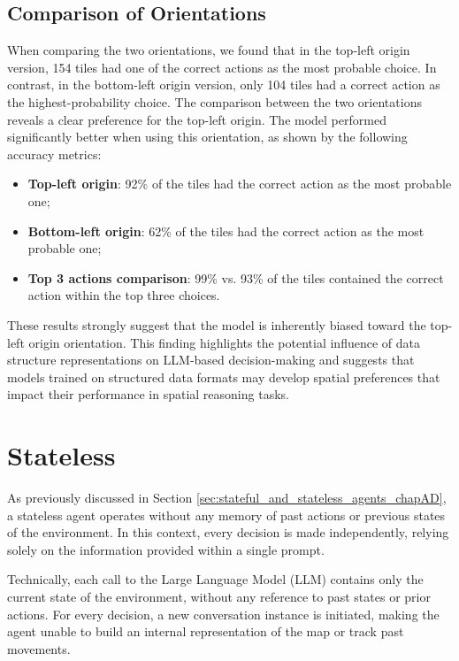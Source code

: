 \vspace{5mm}

\subsection{Comparison of Orientations}

When comparing the two orientations, we found that in the top-left origin
version, 154 tiles had one of the correct actions as the most probable choice.
In contrast, in the bottom-left origin version, only 104 tiles had a correct
action as the highest-probability choice. The comparison between the two orientations
reveals a clear preference for the top-left origin. The model performed
significantly better when using this orientation, as shown by the following accuracy
metrics:
\begin{itemize}
  \item \textbf{Top-left origin}: 92\% of the tiles had the correct action as
    the most probable one;

  \item \textbf{Bottom-left origin}: 62\% of the tiles had the correct action as
    the most probable one;

  \item \textbf{Top 3 actions comparison}: 99\% vs. 93\% of the tiles contained
    the correct action within the top three choices.
\end{itemize}

These results strongly suggest that the model is inherently biased toward the top-left
origin orientation. This finding highlights the potential influence of data
structure representations on LLM-based decision-making and suggests that models
trained on structured data formats may develop spatial preferences that impact
their performance in spatial reasoning tasks.

\section{Stateless}
\label{sec:stateless}

As previously discussed in Section \ref{sec:stateful_and_stateless_agents_chapAD},
a stateless agent operates without any memory of past actions or previous states
of the environment. In this context, every decision is made independently, relying
solely on the information provided within a single prompt.

Technically, each call to the Large Language Model (LLM) contains only the
current state of the environment, without any reference to past states or prior actions.
For every decision, a new conversation instance is initiated, making the agent
unable to build an internal representation of the map or track past movements.

